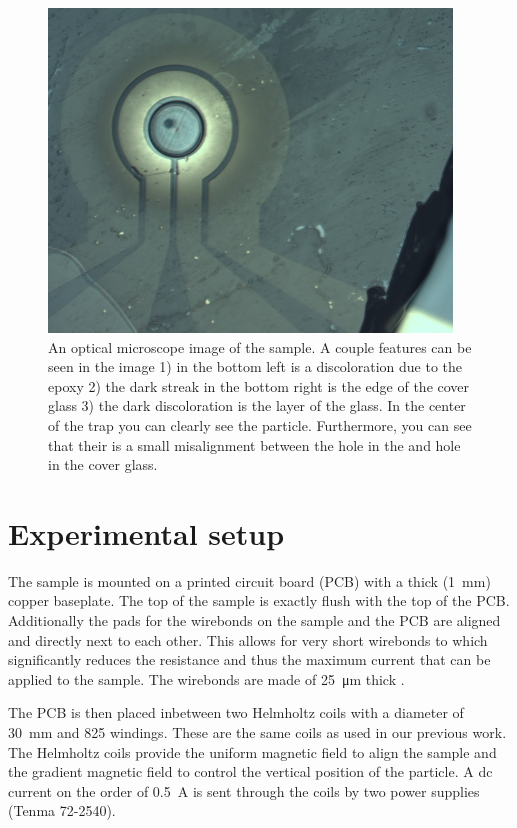 \begin{figure}
    \centering
    \includegraphics{figures/sample/trap_optical_microscope.pdf}
    \caption{An optical microscope image of the sample. A couple features can be seen in the image 1) in the bottom left is a discoloration due to the epoxy 2) the dark streak in the bottom right is the edge of the cover glass 3) the dark discoloration is the  layer of the glass. In the center of the trap you can clearly see the  particle. Furthermore, you can see that their is a small misalignment between the hole in the  and hole in the cover glass.}
    \label{fig:optical-microscope-image-sample}
\end{figure}

\section{Experimental setup}
The sample is mounted on a printed circuit board (PCB) with a thick (\qty{1}{\mm}) copper baseplate. The top of the sample is exactly flush with the top of the PCB. Additionally the pads for the wirebonds on the sample and the PCB are aligned and directly next to each other. This allows for very short wirebonds to which significantly reduces the resistance and thus the maximum current that can be applied to the sample. The wirebonds are made of \qty{25}{\um} thick .

The PCB is then placed inbetween two Helmholtz coils with a diameter of \qty{30}{\mm} and 825 windings. These are the same coils as used in our previous work\cite{eli,mart}. The Helmholtz coils provide the uniform magnetic field to align the sample and the gradient magnetic field to control the vertical position of the particle. A dc current on the order of \qty{0.5}{\ampere} is sent through the coils by two power supplies (Tenma 72-2540).

